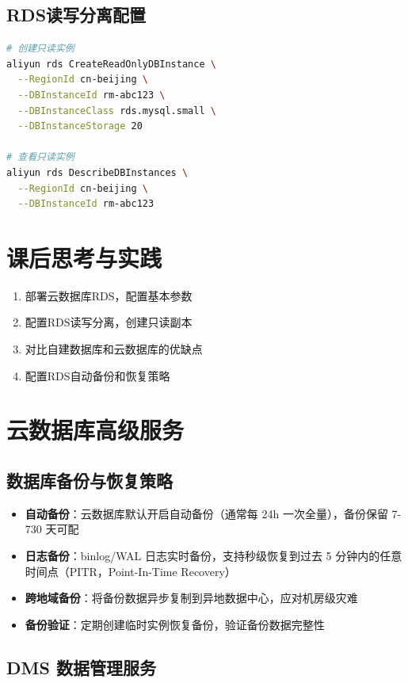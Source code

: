 \documentclass[12pt,UTF8]{ctexbook}
\begin{document}
\subsection*{RDS读写分离配置}

\begin{lstlisting}[language=bash]
# 创建只读实例
aliyun rds CreateReadOnlyDBInstance \
  --RegionId cn-beijing \
  --DBInstanceId rm-abc123 \
  --DBInstanceClass rds.mysql.small \
  --DBInstanceStorage 20

# 查看只读实例
aliyun rds DescribeDBInstances \
  --RegionId cn-beijing \
  --DBInstanceId rm-abc123
\end{lstlisting}

\section{课后思考与实践}
\label{sec:cloud-db-practice}
\begin{enumerate}
    \item 部署云数据库RDS，配置基本参数
    \item 配置RDS读写分离，创建只读副本
    \item 对比自建数据库和云数据库的优缺点
    \item 配置RDS自动备份和恢复策略
\end{enumerate}

\section{云数据库高级服务}
\label{sec:cloud-db-advanced}

\subsection*{数据库备份与恢复策略}

\begin{itemize}
    \item \textbf{自动备份}：云数据库默认开启自动备份（通常每 24h 一次全量），备份保留 7-730 天可配
    \item \textbf{日志备份}：binlog/WAL 日志实时备份，支持秒级恢复到过去 5 分钟内的任意时间点（PITR，Point-In-Time Recovery）
    \item \textbf{跨地域备份}：将备份数据异步复制到异地数据中心，应对机房级灾难
    \item \textbf{备份验证}：定期创建临时实例恢复备份，验证备份数据完整性
\end{itemize}

\subsection*{DMS 数据管理服务}
\end{document}

